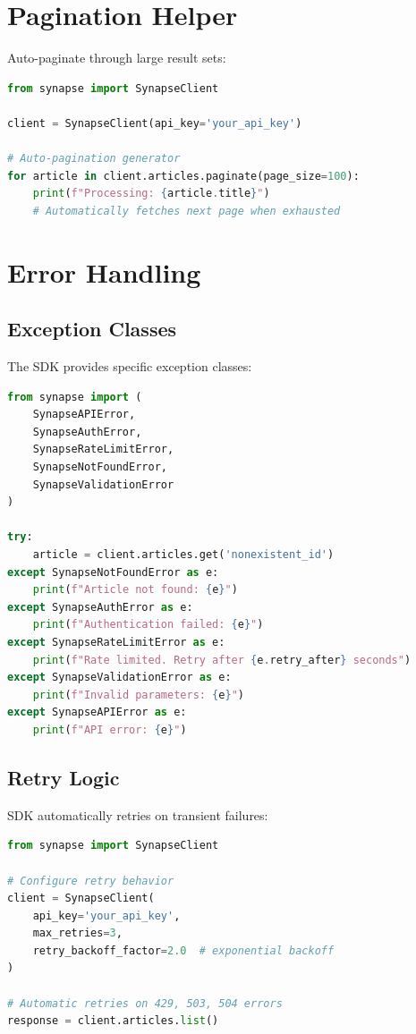 \documentclass{report}
\begin{document}
\section{Pagination Helper}

Auto-paginate through large result sets:

\begin{lstlisting}[language=Python]
from synapse import SynapseClient

client = SynapseClient(api_key='your_api_key')

# Auto-pagination generator
for article in client.articles.paginate(page_size=100):
    print(f"Processing: {article.title}")
    # Automatically fetches next page when exhausted
\end{lstlisting}

\section{Error Handling}

\subsection{Exception Classes}

The SDK provides specific exception classes:

\begin{lstlisting}[language=Python]
from synapse import (
    SynapseAPIError,
    SynapseAuthError,
    SynapseRateLimitError,
    SynapseNotFoundError,
    SynapseValidationError
)

try:
    article = client.articles.get('nonexistent_id')
except SynapseNotFoundError as e:
    print(f"Article not found: {e}")
except SynapseAuthError as e:
    print(f"Authentication failed: {e}")
except SynapseRateLimitError as e:
    print(f"Rate limited. Retry after {e.retry_after} seconds")
except SynapseValidationError as e:
    print(f"Invalid parameters: {e}")
except SynapseAPIError as e:
    print(f"API error: {e}")
\end{lstlisting}

\subsection{Retry Logic}

SDK automatically retries on transient failures:

\begin{lstlisting}[language=Python]
from synapse import SynapseClient

# Configure retry behavior
client = SynapseClient(
    api_key='your_api_key',
    max_retries=3,
    retry_backoff_factor=2.0  # exponential backoff
)

# Automatic retries on 429, 503, 504 errors
response = client.articles.list()
\end{lstlisting}
\end{document}
